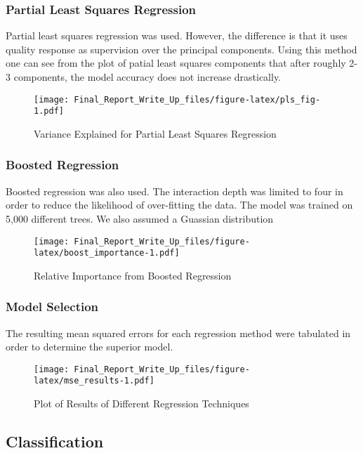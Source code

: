 \documentclass[]{article}
\begin{document}
\subsubsection{Partial Least Squares
Regression}\label{partial-least-squares-regression}

Partial least squares regression was used. However, the difference is
that it uses quality response as supervision over the principal
components. Using this method one can see from the plot of patial least
squares components that after roughly 2-3 components, the model accuracy
does not increase drastically.

\begin{figure}[htbp]
\centering
\texttt{[image: Final\_Report\_Write\_Up\_files/figure-latex/pls\_fig-1.pdf]}
\caption{Variance Explained for Partial Least Squares Regression}
\end{figure}

\subsubsection{Boosted Regression}\label{boosted-regression}

Boosted regression was also used. The interaction depth was limited to
four in order to reduce the likelihood of over-fitting the data. The
model was trained on 5,000 different trees. We also assumed a Guassian
distribution

\begin{figure}[H]
\centering
\texttt{[image: Final\_Report\_Write\_Up\_files/figure-latex/boost\_importance-1.pdf]}
\caption{Relative Importance from Boosted Regression}
\end{figure}

\subsubsection{Model Selection}\label{model-selection}

The resulting mean squared errors for each regression method were
tabulated in order to determine the superior model.

\begin{figure}[H]
\centering
\texttt{[image: Final\_Report\_Write\_Up\_files/figure-latex/mse\_results-1.pdf]}
\caption{Plot of Results of Different Regression Techniques}
\end{figure}

\subsection{Classification}\label{classification}
\end{document}
